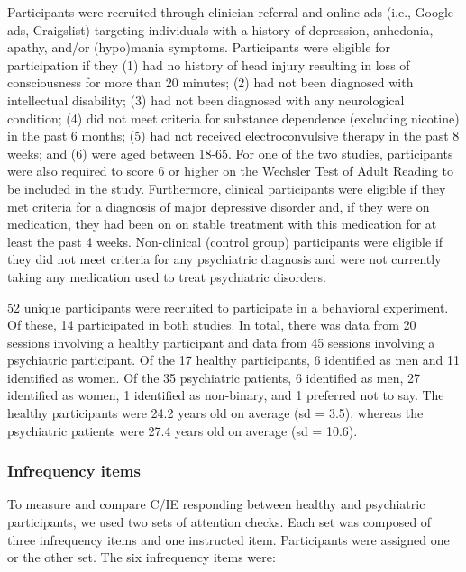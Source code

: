 \documentclass[a4paper,notitlepage,12pt]{article}
\begin{document}
Participants were recruited through clinician referral and online ads (i.e., Google ads, Craigslist) targeting individuals with a history of depression, anhedonia, apathy, and/or (hypo)mania symptoms. Participants were eligible for participation if they (1) had no history of head injury resulting in loss of consciousness for more than 20 minutes; (2) had not been diagnosed with intellectual disability; (3) had not been diagnosed with any neurological condition; (4) did not meet criteria for substance dependence (excluding nicotine) in the past 6 months; (5) had not received electroconvulsive therapy in the past 8 weeks; and (6) were aged between 18-65. For one of the two studies, participants were also required to score 6 or higher on the Wechsler Test of Adult Reading to be included in the study. Furthermore, clinical participants were eligible if they met criteria for a diagnosis of major depressive disorder and, if they were on medication, they had been on on stable treatment with this medication for at least the past 4 weeks. Non-clinical (control group) participants were eligible if they did not meet criteria for any psychiatric diagnosis and were not currently taking any medication used to treat psychiatric disorders.

52 unique participants were recruited to participate in a behavioral experiment. Of these, 14 participated in both studies. In total, there was data from 20 sessions involving a healthy participant and data from 45 sessions involving a psychiatric participant. Of the 17 healthy participants, 6 identified as men and 11 identified as women. Of the 35 psychiatric patients, 6 identified as men, 27 identified as women, 1 identified as non-binary, and 1 preferred not to say. The healthy participants were 24.2 years old on average (sd = 3.5), whereas the psychiatric patients were 27.4 years old on average (sd = 10.6).

\subsubsection*{Infrequency items}

To measure and compare C/IE responding between healthy and psychiatric participants, we used two sets of attention checks. Each set was composed of three infrequency items and one instructed item. Participants were assigned one or the other set. The six infrequency items were:
\end{document}
